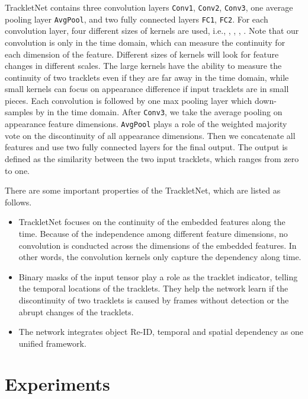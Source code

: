 \documentclass[10pt,twocolumn,letterpaper]{article}
\begin{document}
TrackletNet contains three convolution layers \texttt{Conv1}, \texttt{Conv2}, \texttt{Conv3}, one average pooling layer \texttt{AvgPool}, and two fully connected layers \texttt{FC1}, \texttt{FC2}. 
For each convolution layer, four different sizes of kernels are used, i.e., , , , . Note that our convolution is only in the time domain, which can measure the continuity for each dimension of the feature. Different sizes of kernels will look for feature changes in different scales. The large kernels have the ability to measure the continuity of two tracklets even if they are far away in the time domain, while small kernels can focus on appearance difference if input tracklets are in small pieces. Each convolution is followed by one max pooling layer which down-samples by  in the time domain. After \texttt{Conv3}, we take the average pooling on appearance feature dimensions. \texttt{AvgPool} plays a role of the weighted majority vote on the discontinuity of all appearance dimensions. Then we concatenate all features and use two fully connected layers for the final output. The output is defined as the similarity between the two input tracklets, which ranges from zero to one. 







There are some important properties of the TrackletNet, which are listed as follows.
\begin{itemize}
\setlength\itemsep{-0.2em}
    \item TrackletNet focuses on the continuity of the embedded features along the time. Because of the independence among different feature dimensions, no convolution is conducted across the dimensions of the embedded features. In other words, the convolution kernels only capture the dependency along time.
    \item Binary masks of the input tensor play a role as the tracklet indicator, telling the temporal locations of the tracklets. They help the network learn if the discontinuity of two tracklets is caused by frames without detection or the abrupt changes of the tracklets. \item The network integrates object Re-ID, temporal and spatial dependency as one unified framework.
\end{itemize}




\section{Experiments}
\label{sec:experiment}
\end{document}

